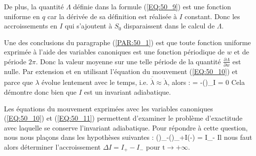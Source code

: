 De plus, la quantit\'{e} $\Lambda$ d\'{e}finie dans la formule (\ref{EQ:50_9}) est une fonction uniforme en $q$ car la d\'{e}riv\'{e}e de sa d\'{e}finition est r\'{e}alis\'{e}e \`{a} $I$ constant. Donc les accroissements en $I$ qui s'ajoutent \`{a} $S_{0}$ disparaissent dans le calcul de $\Lambda$.

Une des conclusions du paragraphe (\ref{PAR:50_1}) est que toute fonction uniforme exprim\'{e}e \`{a} l'aide des variables canoniques est une fonction p\'{e}riodique de $w$ et de p\'{e}riode $2\pi$. Donc la valeur moyenne sur une telle p\'{e}riode de la quantit\'{e} $\frac{\partial\Lambda}{\partial w}$ est nulle. Par extension et en utilisant l'\'{e}quation du mouvement (\ref{EQ:50_10}) et parce que $\lambda$ \'{e}volue lentement avec le temps, i.e. $\overline{\dot{\lambda}} \approx \dot{\lambda}$, alors :
\be
	 = -\left(\right)_{I}\dot{\lambda} = 0 \label{EQ:51_1}
\ee
Cela d\'{e}montre donc bien que $I$ est un invariant adiabatique.

Les \'{e}quations du mouvement exprim\'{e}es avec les variables canoniques (\ref{EQ:50_10}) et (\ref{EQ:50_11}) permettent d'examiner le probl\`{e}me d'exactitude avec laquelle se conserve l'invariant adiabatique. Pour r\'{e}pondre \`{a} cette question, nous nous pla\c{c}ons dans les hypoth\`{e}ses suivantes :
\benn
	\lambda()\lambda_{-}\text{, }\lambda()\lambda_{+}I(\rightarrow -\infty) = I_{-}
\eenn
Il nous faut alors d\'{e}terminer l'accroissement $\Delta I = I_{+} - I_{-}$ pour $\mathrm{t}\rightarrow +\infty$.


